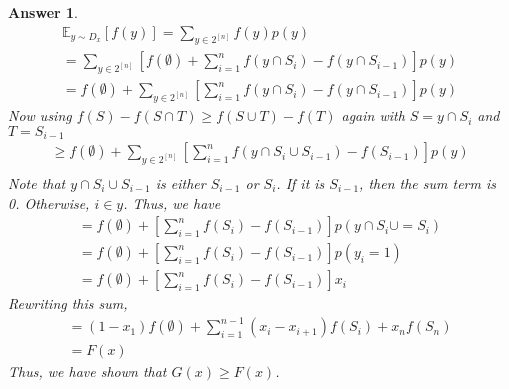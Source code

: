 \documentclass[12pt]{article}
\theoremstyle{colon}
\newtheorem*{answer}{Answer}
\begin{document}
\begin{answer}
\begin{gather*}
    \mathbb{E}_{y \sim D_x} [f(y)] = \sum_{y \in 2^{[n]}} f(y)p(y) \\
    = \sum_{y \in 2^{[n]}} \left[ f(\emptyset) + \sum_{i=1}^n  f(y \cap S_i) - f(y \cap S_{i-1}) \right]p(y) \\
    = f(\emptyset) + \sum_{y \in 2^{[n]}} \left[ \sum_{i=1}^n f(y \cap S_i) - f(y \cap S_{i-1}) \right]p(y)
  \end{gather*}
  Now using $f(S) - f(S \cap T) \geq f(S \cup T) - f(T)$ again with $S = y \cap S_i$ and $T = S_{i-1}$
  \begin{gather*}
    \geq f(\emptyset) + \sum_{y \in 2^{[n]}} \left[ \sum_{i=1}^n f(y \cap S_i \cup S_{i-1}) - f(S_{i-1}) \right]p(y) \\
  \end{gather*}
  Note that $y \cap S_i \cup S_{i-1}$ is either $S_{i-1}$ or $S_i$. If it is $S_{i-1}$, then the sum term is 0. Otherwise, $i \in y$. Thus, we have
  \begin{gather*}
    = f(\emptyset) + \left[ \sum_{i=1}^n f(S_i) - f(S_{i-1}) \right]p(y \cap S_i \cup = S_i) \\
    = f(\emptyset) + \left[ \sum_{i=1}^n f(S_i) - f(S_{i-1}) \right]p(y_i = 1) \\
    = f(\emptyset) + \left[ \sum_{i=1}^n f(S_i) - f(S_{i-1}) \right]x_i
  \end{gather*}
  Rewriting this sum,
  \begin{gather*}
    = (1-x_1)f(\emptyset) + \sum_{i=1}^{n-1} (x_i - x_{i+1}) f(S_i) + x_n f(S_n) \\
    = F(x)
  \end{gather*}
  Thus, we have shown that $G(x) \geq F(x)$.
\end{answer}

\clearpage
\end{document}
